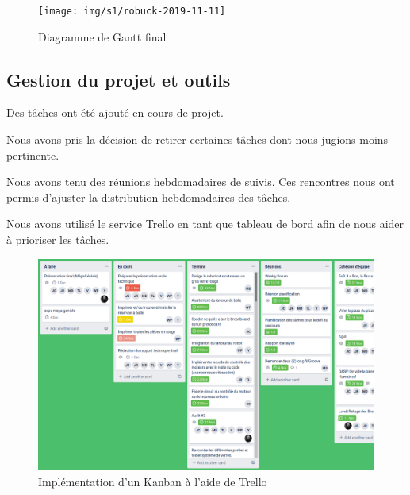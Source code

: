 \begin{figure}[h!]
    \centering
    \texttt{[image: img/s1/robuck-2019-11-11]}
    \caption{Diagramme de Gantt final}
    \label{fig:planif-final}
\end{figure}

\subsection{Gestion du projet et outils}


Des tâches ont été ajouté en cours de projet.

Nous avons pris la décision de retirer certaines tâches dont nous jugions moins pertinente.



Nous avons tenu des réunions hebdomadaires de suivis.
Ces rencontres nous ont permis d'ajuster la distribution hebdomadaires des tâches.

Nous avons utilisé le service Trello en tant que tableau de bord afin de nous aider à prioriser les tâches.

\begin{figure}[h!]
    \centering
    \includegraphics[width=\linewidth]{img/s1/trello}
    \caption{Implémentation d'un Kanban à l'aide de Trello}
    \label{fig:planif-trello}
\end{figure}
